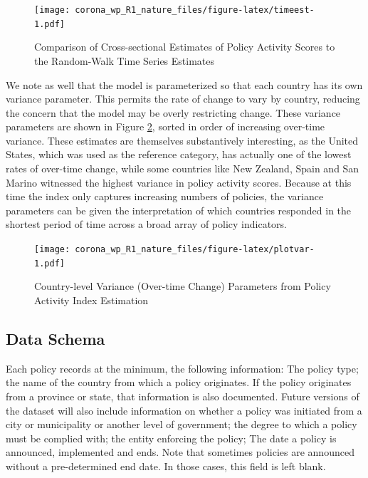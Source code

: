 \documentclass[
]{article}
\begin{document}
\begin{figure}
\centering
\texttt{[image: corona\_wp\_R1\_nature\_files/figure-latex/timeest-1.pdf]}
\caption{\label{fig:timeest}Comparison of Cross-sectional Estimates of Policy Activity Scores to the Random-Walk Time Series Estimates}
\end{figure}

We note as well that the model is parameterized so that each country has its own variance parameter. This permits the rate of change to vary by country, reducing the concern that the model may be overly restricting change. These variance parameters are shown in Figure \ref{fig:plotvar}, sorted in order of increasing over-time variance. These estimates are themselves substantively interesting, as the United States, which was used as the reference category, has actually one of the lowest rates of over-time change, while some countries like New Zealand, Spain and San Marino witnessed the highest variance in policy activity scores. Because at this time the index only captures increasing numbers of policies, the variance parameters can be given the interpretation of which countries responded in the shortest period of time across a broad array of policy indicators.

\begin{figure}
\centering
\texttt{[image: corona\_wp\_R1\_nature\_files/figure-latex/plotvar-1.pdf]}
\caption{\label{fig:plotvar}Country-level Variance (Over-time Change) Parameters from Policy Activity Index Estimation}
\end{figure}

\hypertarget{data-schema}{%
\subsection*{Data Schema}\label{data-schema}}

Each policy records at the minimum, the following information: The policy type; the name of the country from which a policy originates. If the policy originates from a province or state, that information is also documented. Future versions of the dataset will also include information on whether a policy was initiated from a city or municipality or another level of government; the degree to which a policy must be complied with; the entity enforcing the policy; The date a policy is announced, implemented and ends. Note that sometimes policies are announced without a pre-determined end date. In those cases, this field is left blank.
\end{document}
